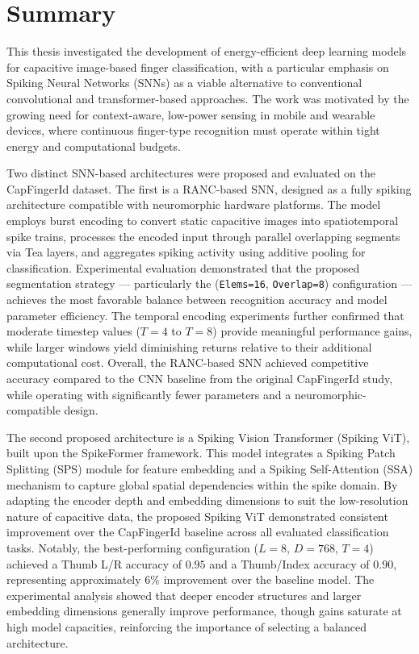\documentclass[../main.tex]{subfiles}
\begin{document}
\section{Summary}

This thesis investigated the development of energy-efficient deep learning models
for capacitive image-based finger classification, with a particular emphasis on
Spiking Neural Networks (SNNs) as a viable alternative to conventional
convolutional and transformer-based approaches. The work was motivated by the
growing need for context-aware, low-power sensing in mobile and wearable devices,
where continuous finger-type recognition must operate within tight energy and
computational budgets.

Two distinct SNN-based architectures were proposed and evaluated on the
CapFingerId dataset. The first is a RANC-based SNN, designed as a fully spiking
architecture compatible with neuromorphic hardware platforms. The model employs
burst encoding to convert static capacitive images into spatiotemporal spike trains,
processes the encoded input through parallel overlapping segments via Tea layers,
and aggregates spiking activity using additive pooling for classification.
Experimental evaluation demonstrated that the proposed segmentation strategy ---
particularly the (\texttt{Elems=16}, \texttt{Overlap=8}) configuration --- achieves
the most favorable balance between recognition accuracy and model parameter
efficiency. The temporal encoding experiments further confirmed that moderate
timestep values ($T = 4$ to $T = 8$) provide meaningful performance gains, while
larger windows yield diminishing returns relative to their additional computational
cost. Overall, the RANC-based SNN achieved competitive accuracy compared to the
CNN baseline from the original CapFingerId study, while operating with
significantly fewer parameters and a neuromorphic-compatible design.

The second proposed architecture is a Spiking Vision Transformer (Spiking ViT),
built upon the SpikeFormer framework. This model integrates a Spiking Patch
Splitting (SPS) module for feature embedding and a Spiking Self-Attention (SSA)
mechanism to capture global spatial dependencies within the spike domain. By
adapting the encoder depth and embedding dimensions to suit the low-resolution
nature of capacitive data, the proposed Spiking ViT demonstrated consistent
improvement over the CapFingerId baseline across all evaluated classification tasks.
Notably, the best-performing configuration ($L = 8$, $D = 768$, $T = 4$) achieved
a Thumb L/R accuracy of $0.95$ and a Thumb/Index accuracy of $0.90$,
representing approximately $6\%$ improvement over the baseline model. The
experimental analysis showed that deeper encoder structures and larger embedding
dimensions generally improve performance, though gains saturate at high model
capacities, reinforcing the importance of selecting a balanced architecture.
\end{document}
